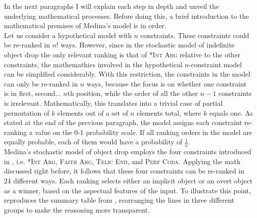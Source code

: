 In the next paragraphs I will explain each step in depth and unveil the underlying mathematical processes. Before doing this, a brief introduction to the mathematical premises of Medina's model is in order.\\
Let us consider a hypothetical model with $n$ constraints. These constraints could be re-ranked in $n!$ ways. However, since in the stochastic model of indefinite object drop the only relevant ranking is that of \textsc{*Int Arg} relative to the other constraints, the mathemathics involved in the hypothetical $n$-constraint model can be simplified considerably. With this restriction, the constraints in the model can only be re-ranked in $n$ ways, because the focus is on whether one constraint is in first, second... $n$th position, while the order of all the other $n-1$ constraints is irrelevant. Mathematically, this translates into a trivial case of partial permutation of $k$ elements out of a set of $n$ elements total, where $k$ equals one. As stated at the end of the previous paragraph, the model assigns each constraint re-ranking a value on the 0-1 probability scale. If all ranking orders in the model are equally probable, each of them would have a probability of $\frac{1}{n}$.\\
Medina's stochastic model of object drop employs the four constraints introduced in , i.e. \textsc{*Int Arg}, \textsc{Faith Arg}, \textsc{Telic End}, and \textsc{Perf Coda}. Applying the math discussed right before, it follows that these four constraints can be re-ranked in 24 different ways. Each ranking selects either an implicit object or an overt object as a winner, based on the aspectual features of the input. To illustrate this point,  reproduces the summary table from \textcite[89]{Medina2007}, rearranging the lines in three different groups to make the reasoning more transparent.

